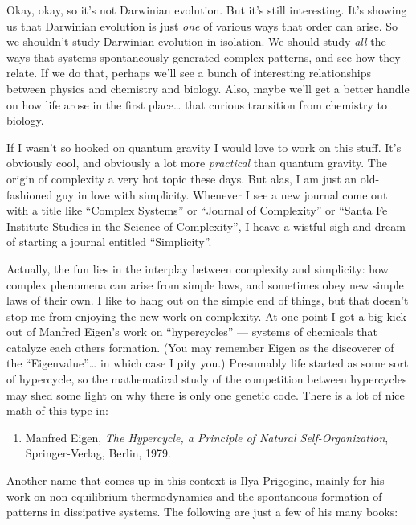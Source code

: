 \documentclass{article}
\def\tightlist{}
\begin{document}
Okay, okay, so it's not Darwinian evolution. But it's still interesting.
It's showing us that Darwinian evolution is just \emph{one} of various
ways that order can arise. So we shouldn't study Darwinian evolution in
isolation. We should study \emph{all} the ways that systems
spontaneously generated complex patterns, and see how they relate. If we
do that, perhaps we'll see a bunch of interesting relationships between
physics and chemistry and biology. Also, maybe we'll get a better handle
on how life arose in the first place\ldots{} that curious transition
from chemistry to biology.

If I wasn't so hooked on quantum gravity I would love to work on this
stuff. It's obviously cool, and obviously a lot more \emph{practical}
than quantum gravity. The origin of complexity a very hot topic these
days. But alas, I am just an old-fashioned guy in love with simplicity.
Whenever I see a new journal come out with a title like ``Complex
Systems'' or ``Journal of Complexity'' or ``Santa Fe Institute Studies
in the Science of Complexity'', I heave a wistful sigh and dream of
starting a journal entitled ``Simplicity''.

Actually, the fun lies in the interplay between complexity and
simplicity: how complex phenomena can arise from simple laws, and
sometimes obey new simple laws of their own. I like to hang out on the
simple end of things, but that doesn't stop me from enjoying the new
work on complexity. At one point I got a big kick out of Manfred Eigen's
work on ``hypercycles'' --- systems of chemicals that catalyze each
others formation. (You may remember Eigen as the discoverer of the
``Eigenvalue''\ldots{} in which case I pity you.) Presumably life
started as some sort of hypercycle, so the mathematical study of the
competition between hypercycles may shed some light on why there is only
one genetic code. There is a lot of nice math of this type in:

\begin{enumerate}
\def\labelenumi{\arabic{enumi})}
\tightlist
\item
  Manfred Eigen, \emph{The Hypercycle, a Principle of Natural
  Self-Organization}, Springer-Verlag, Berlin, 1979.
\end{enumerate}

Another name that comes up in this context is Ilya Prigogine, mainly for
his work on non-equilibrium thermodynamics and the spontaneous formation
of patterns in dissipative systems. The following are just a few of his
many books:
\end{document}
